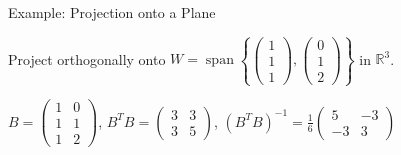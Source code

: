 \documentclass[10pt]{beamer}
\theoremstyle{definition}
\begin{document}
\begin{frame}{Example: Projection onto a Plane}

Project orthogonally onto $W = \operatorname{span}\left\{\begin{pmatrix} 1\\1\\1 \end{pmatrix}, \begin{pmatrix} 0\\1\\2 \end{pmatrix}\right\}$ in $\mathbb{R}^3$.

\vspace{0.3em}

$B = \begin{pmatrix} 1 & 0 \\ 1 & 1 \\ 1 & 2 \end{pmatrix}$, \quad $B^TB = \begin{pmatrix} 3 & 3 \\ 3 & 5 \end{pmatrix}$, \quad $(B^TB)^{-1} = \frac{1}{6}\begin{pmatrix} 5 & -3 \\ -3 & 3 \end{pmatrix}$

\end{frame}
\end{document}
